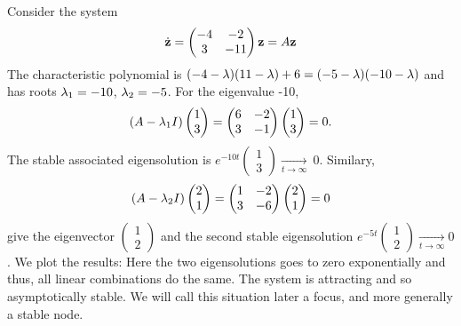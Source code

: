 \begin{exemple}[focus]
Consider the system
$$ \dot{\mathbf{z}}=
\begin{pmatrix} -4&-2\\3&-11 \end{pmatrix}\mathbf{z} =A\mathbf{z}
$$
The characteristic polynomial is $(-4-\lambda)(11-\lambda)+6=(-5-\lambda)(-10-\lambda)$ and has roots $\lambda_1=-10$, $\lambda_2=-5$. For the eigenvalue -10, $$ (A-\lambda_1I)\begin{pmatrix}1\\3\end{pmatrix}
= \begin{pmatrix}6&-2\\3&-1\end{pmatrix} \begin{pmatrix}1\\3\end{pmatrix} = 0.$$
The stable associated eigensolution is $e^{-10t}\begin{pmatrix}1\\3\end{pmatrix} \xrightarrow[t\to\infty]{}~0$. Similary, 
$$ (A-\lambda_2I)\begin{pmatrix}2\\1\end{pmatrix}
= \begin{pmatrix} 1&-2\\3&-6 \end{pmatrix} \begin{pmatrix}2\\1\end{pmatrix} = 0$$
give the eigenvector $\begin{pmatrix}1\\2\end{pmatrix}$ and the second stable eigensolution $e^{-5t}\begin{pmatrix}1\\2\end{pmatrix}\xrightarrow[t\to\infty]~0$. We plot the results: 
Here the two eigensolutions goes to zero exponentially and thus, all linear combinations do the same. The system is attracting and so asymptotically stable. We will call this situation later a focus, and more generally a stable node.
\end{exemple}

